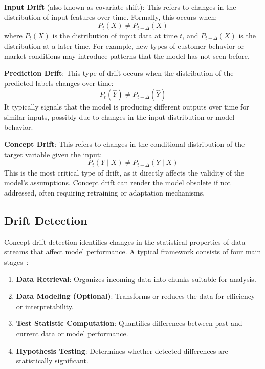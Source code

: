 \textbf{Input Drift} (also known as covariate shift): This refers to changes in the distribution
of input features over time. Formally, this occurs when:
\begin{equation}
    P_t(X) \neq P_{t+\Delta}(X)
\end{equation}
where $ P_t(X) $ is the distribution of input data at time $ t $, and $
    P_{t+\Delta}(X) $ is the distribution at a later time. For example, new types
of customer behavior or market conditions may introduce patterns that the model
has not seen before.

\textbf{Prediction Drift}: This type of drift occurs when the distribution of the predicted
labels changes over time:
\begin{equation}
    P_t(\hat{Y}) \neq P_{t+\Delta}(\hat{Y})
\end{equation}
It typically signals that the model is producing different outputs over time
for similar inputs, possibly due to changes in the input distribution or model
behavior.

\textbf{Concept Drift}: This refers to changes in the conditional distribution of the target
variable given the input:
\begin{equation}
    P_t(Y \mid X) \neq P_{t+\Delta}(Y \mid X)
\end{equation}
This is the most critical type of drift, as it directly affects the validity of
the model's assumptions. Concept drift can render the model obsolete if not
addressed, often requiring retraining or adaptation mechanisms.

\subsection*{Drift Detection}\label{subsec:drift_detection}
Concept drift detection identifies changes in the statistical properties of
data streams that affect model performance. A typical framework consists of
four main stages~\cite{learning_under_concept_drift}:

\begin{enumerate}
    \item \textbf{Data Retrieval}: Organizes incoming data into chunks 
    suitable for analysis.
    \item \textbf{Data Modeling (Optional)}: Transforms or reduces the data 
    for efficiency or interpretability.
    \item \textbf{Test Statistic Computation}: Quantifies differences between 
    past and current data or model performance.
    \item \textbf{Hypothesis Testing}: Determines whether detected differences 
    are statistically significant.
\end{enumerate}

